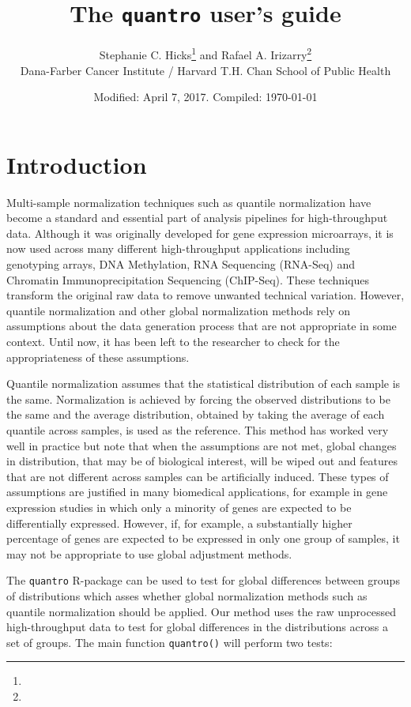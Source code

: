 \documentclass{article}\usepackage[]{graphicx}\usepackage[usenames,dvipsnames]{color}
\title{The \texttt{quantro} user's guide}
\author{Stephanie C. Hicks\thanks{\email{shicks@jimmy.harvard.edu}} and
Rafael A. Irizarry\thanks{\email{rafa@jimmy.harvard.edu}} \\ 
Dana-Farber Cancer Institute / Harvard T.H. Chan School of Public Health}
\date{Modified: April 7, 2017.  Compiled: \today}
\begin{document}
\maketitle
 
\tableofcontents

\section{Introduction}

Multi-sample normalization techniques such as quantile normalization 
\cite{Bolstad2003, Irizarry2003} have become a standard and essential part of 
analysis pipelines for high-throughput data. Although it was originally 
developed for gene expression microarrays, it is now used across many 
different high-throughput applications including genotyping arrays, DNA 
Methylation, RNA Sequencing (RNA-Seq) and Chromatin Immunoprecipitation 
Sequencing (ChIP-Seq). These techniques transform the original raw data to 
remove unwanted technical variation. However, quantile normalization and other 
global normalization methods rely on assumptions about the data generation 
process that are not appropriate in some context. Until now, it has been left 
to the researcher to check for the appropriateness of these assumptions. 

Quantile normalization assumes that the statistical distribution of each 
sample is the same. Normalization is achieved by forcing the observed 
distributions to be the same and the average distribution, obtained by taking 
the average of each quantile across samples, is used as the reference. This 
method has worked very well in practice but note that when the assumptions are 
not met, global changes in distribution, that may be of biological interest, 
will be wiped out and features that are not different across samples can be 
artificially induced.  These types of assumptions are justified in many 
biomedical applications, for example in gene expression studies in which only 
a minority of genes are expected to be differentially expressed. However, if, 
for example, a substantially higher percentage of genes are expected to be 
expressed in only one group of samples, it may not be appropriate to use 
global adjustment methods. 

The \texttt{quantro} R-package can be used to test for global differences 
between groups of distributions which asses whether global normalization 
methods such as quantile normalization should be applied. Our method uses 
the raw unprocessed high-throughput data to test for global differences in 
the distributions across a set of groups. The main function \texttt{quantro()} 
will perform two tests: 
\end{document}
